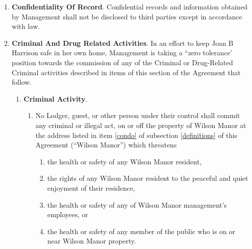 \documentclass[12pt,letterpaper]{article}
\newcommand{\lodger}{Lodger}
\newcommand{\mom}{Joan B Harrison}
\newcommand{\management}{Management}
\newcommand{\myemail}{Management Email}
\newcommand{\condo}{Wilson Manor}
\newcommand{\lemail}{Lodger Email}
\newcommand{\paymenttime}{Payment Notification Time-Date}
\begin{document}
\begin{enumerate}
\begin{enumerate}
\begin{enumerate}
						Venmo will notify \management{} of the payment via the \myemail{}, and \management{} will consider the payment as having been received at the time and date stamped on the Venmo notification (``\paymenttime{}''). 
					\item For reasons of security and convenience, \management{} shall not accept cash payments. Unless otherwise directed in writing by \management{}, all payments shall be made through Venmo's website https://venmo.com/, one of Venmo's apps for Android/iOS, or by any other method Venmo provides. 
				\end{enumerate}
			\item \textbf{Receipt}. \management{} will provide receipt of payment via one of the \lemail{} that is set forth in item \ref{lemail} of subsection \ref{definitions} of this Agreement{}, and record payment was received at the \paymenttime{}. 
		\end{enumerate}
	\item \textbf{Confidentiality Of Record}. 
		Confidential records and information obtained by \management{} shall not be disclosed to third parties except in accordance with law. 
	\item \textbf{Criminal And Drug Related Activities}. 
		In an effort to keep \mom{} safe in her own home, \management{} is taking a ``zero tolerance' position towards the commission of any of the Criminal or Drug-Related Criminal activities described in items of this section of the Agreement that follow. 
		\begin{enumerate} 
			\item \textbf{Criminal Activity}. \label{criminal}
				\begin{enumerate}
					\item No \lodger{}, guest, or other person under their control shall commit any criminal or illegal act, on or off the property of \condo{} at the address listed in item \ref{condo} of subsection \ref{definitions} of this Agreement (``\condo{}'') which threatens 
						\begin{enumerate} 
							\item the health or safety of any \condo{} resident, 
							\item the rights of any \condo{} resident to the peaceful and quiet enjoyment of their residence, 
							\item the health or safety of any of \condo{} management's employees, or 
							\item the health or safety of any member of the public who is on or near \condo{} property. 

\end{enumerate}
\end{enumerate}
\end{enumerate}
\end{enumerate}
\end{document}
